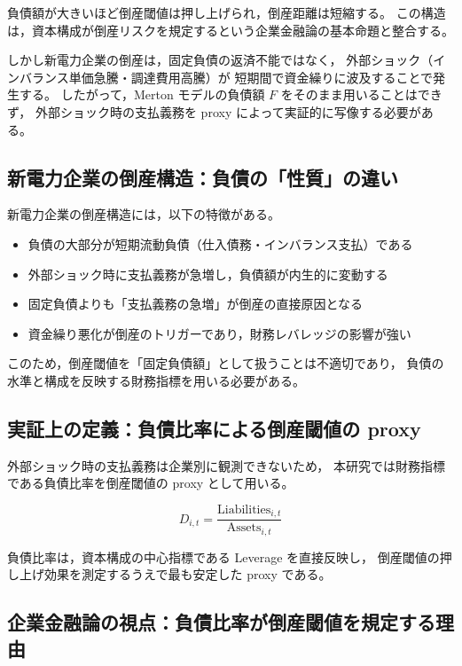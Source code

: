 負債額が大きいほど倒産閾値は押し上げられ，倒産距離は短縮する。
この構造は，資本構成が倒産リスクを規定するという企業金融論の基本命題と整合する。

しかし新電力企業の倒産は，固定負債の返済不能ではなく，
外部ショック（インバランス単価急騰・調達費用高騰）が
短期間で資金繰りに波及することで発生する。
したがって，Merton モデルの負債額 $F$ をそのまま用いることはできず，
外部ショック時の支払義務を proxy によって実証的に写像する必要がある。

\subsection{新電力企業の倒産構造：負債の「性質」の違い}

新電力企業の倒産構造には，以下の特徴がある。

\begin{itemize}
    \item 負債の大部分が短期流動負債（仕入債務・インバランス支払）である
    \item 外部ショック時に支払義務が急増し，負債額が内生的に変動する
    \item 固定負債よりも「支払義務の急増」が倒産の直接原因となる
    \item 資金繰り悪化が倒産のトリガーであり，財務レバレッジの影響が強い
\end{itemize}

このため，倒産閾値を「固定負債額」として扱うことは不適切であり，
負債の水準と構成を反映する財務指標を用いる必要がある。

\subsection{実証上の定義：負債比率による倒産閾値の proxy}

外部ショック時の支払義務は企業別に観測できないため，
本研究では財務指標である負債比率を倒産閾値の proxy として用いる。



\[
D_{i,t} = \frac{\mathrm{Liabilities}_{i,t}}{\mathrm{Assets}_{i,t}}
\]



負債比率は，資本構成の中心指標である Leverage を直接反映し，
倒産閾値の押し上げ効果を測定するうえで最も安定した proxy である。

\subsection{企業金融論の視点：負債比率が倒産閾値を規定する理由}

